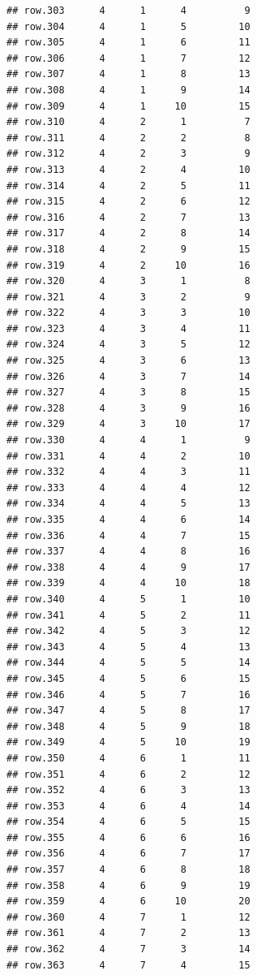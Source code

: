\documentclass[
]{article}
\begin{document}
\begin{verbatim}
## row.303      4      1      4          9
## row.304      4      1      5         10
## row.305      4      1      6         11
## row.306      4      1      7         12
## row.307      4      1      8         13
## row.308      4      1      9         14
## row.309      4      1     10         15
## row.310      4      2      1          7
## row.311      4      2      2          8
## row.312      4      2      3          9
## row.313      4      2      4         10
## row.314      4      2      5         11
## row.315      4      2      6         12
## row.316      4      2      7         13
## row.317      4      2      8         14
## row.318      4      2      9         15
## row.319      4      2     10         16
## row.320      4      3      1          8
## row.321      4      3      2          9
## row.322      4      3      3         10
## row.323      4      3      4         11
## row.324      4      3      5         12
## row.325      4      3      6         13
## row.326      4      3      7         14
## row.327      4      3      8         15
## row.328      4      3      9         16
## row.329      4      3     10         17
## row.330      4      4      1          9
## row.331      4      4      2         10
## row.332      4      4      3         11
## row.333      4      4      4         12
## row.334      4      4      5         13
## row.335      4      4      6         14
## row.336      4      4      7         15
## row.337      4      4      8         16
## row.338      4      4      9         17
## row.339      4      4     10         18
## row.340      4      5      1         10
## row.341      4      5      2         11
## row.342      4      5      3         12
## row.343      4      5      4         13
## row.344      4      5      5         14
## row.345      4      5      6         15
## row.346      4      5      7         16
## row.347      4      5      8         17
## row.348      4      5      9         18
## row.349      4      5     10         19
## row.350      4      6      1         11
## row.351      4      6      2         12
## row.352      4      6      3         13
## row.353      4      6      4         14
## row.354      4      6      5         15
## row.355      4      6      6         16
## row.356      4      6      7         17
## row.357      4      6      8         18
## row.358      4      6      9         19
## row.359      4      6     10         20
## row.360      4      7      1         12
## row.361      4      7      2         13
## row.362      4      7      3         14
## row.363      4      7      4         15

\end{verbatim}
\end{document}

